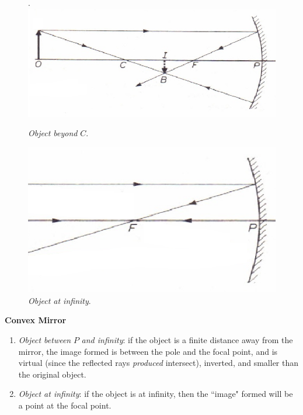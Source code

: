 \documentclass{scrartcl}
\begin{document}
    \begin{figure}[H]
        \centering
        \begin{minipage}[b]{0.49\textwidth}.
        \includegraphics[width=\textwidth]{concave5.eps}
        \caption{\textit{Object beyond} $C$.}
        \end{minipage}
        \hfill
        \begin{minipage}[b]{0.49\textwidth}
            \includegraphics[width=\textwidth]{concave6.eps}
            \caption{\textit{Object at infinity}.}
        \end{minipage}
    \end{figure}
    \quad\textbf{Convex Mirror}
    \begin{enumerate}
        \item \textit{Object between} $P$ \textit{and infinity}: if the object is a finite distance away from the mirror, the image formed is between the pole and the focal point, and is virtual (since the reflected rays \textit{produced} intersect), inverted, and smaller than the original object.
        \item \textit{Object at infinity}: if the object is at infinity, then the ``image" formed will be a point at the focal point.
    \end{enumerate}
\end{document}
